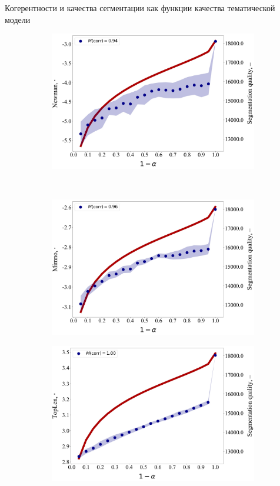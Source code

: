 \documentclass[russian]{beamer}
\begin{document}
\begin{frame}{Когерентности и качества сегментации как функции качества тематической модели}
  
  \begin{figure}[h]
    \begin{subfigure}[t]{0.48\textwidth}
      \includegraphics[width=\linewidth]{newman-iteration.jpg}
    \end{subfigure}
    ~
    \begin{subfigure}[t]{0.48\textwidth}
      \includegraphics[width=\linewidth]{mimno-iteration.jpg}
    \end{subfigure}
    \begin{subfigure}[t]{0.48\textwidth}
      \includegraphics[width=\linewidth]{toplen-iteration.jpg}

\end{subfigure}
\end{figure}
\end{frame}
\end{document}
